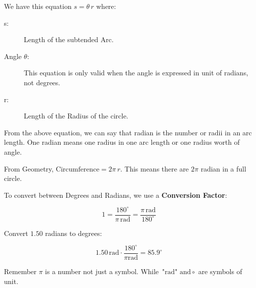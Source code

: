 We have this equation $\boxed{s = \theta\, r}$ where:

\begin{description}
  \item[s:] Length of the subtended Arc.
  \item[Angle $\theta$:] This equation is only valid when the angle is expressed in unit of radians, not degrees.
  \item[r:] Length of the Radius of the circle.
\end{description}

From the above equation, we can say that radian is the number or radii in an arc length. One radian means one radius in one arc length or one radius worth of angle.

From Geometry, \(\text{Circumference} = 2\pi\, r\). This means there are \(2\pi\) radian in a full circle.

To convert between Degrees and Radians, we use a \textbf{Conversion Factor}:

\[1 = \frac{180^{\circ}}{\pi\, \text{rad}} = \frac{\pi\, \text{rad}}{180^{\circ}}\]

Convert \(1.50\) radians to degrees:

\[1.50\, \text{rad} \cdot \frac{180^{\circ}}{\pi\text{rad} } = 85.9^{\circ}\]

Remember \(\pi\) is a number not just a symbol. While \(\text{"rad" and} \, \circ \) are symbols of unit.
